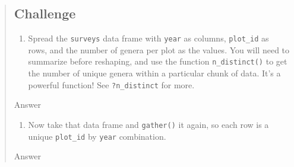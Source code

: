 \documentclass[]{book}
\newenvironment{Shaded}{\begin{snugshade}}{\end{snugshade}}
\newcommand{\KeywordTok}[1]{\textcolor[rgb]{0.13,0.29,0.53}{\textbf{#1}}}
\newcommand{\DataTypeTok}[1]{\textcolor[rgb]{0.13,0.29,0.53}{#1}}
\newcommand{\StringTok}[1]{\textcolor[rgb]{0.31,0.60,0.02}{#1}}
\newcommand{\OperatorTok}[1]{\textcolor[rgb]{0.81,0.36,0.00}{\textbf{#1}}}
\newcommand{\NormalTok}[1]{#1}
\providecommand{\tightlist}{%
  \setlength{\itemsep}{0pt}\setlength{\parskip}{0pt}}
\begin{document}
\begin{quote}
\subsection{Challenge}\label{challenge-7}

\begin{enumerate}
\def\labelenumi{\arabic{enumi}.}
\tightlist
\item
  Spread the \texttt{surveys} data frame with \texttt{year} as columns,
  \texttt{plot\_id} as rows, and the number of genera per plot as the
  values. You will need to summarize before reshaping, and use the
  function \texttt{n\_distinct()} to get the number of unique genera
  within a particular chunk of data. It's a powerful function! See
  \texttt{?n\_distinct} for more.
\end{enumerate}

Answer

\begin{Shaded}
\end{Shaded}

\begin{enumerate}
\def\labelenumi{\arabic{enumi}.}
\setcounter{enumi}{1}
\tightlist
\item
  Now take that data frame and \texttt{gather()} it again, so each row
  is a unique \texttt{plot\_id} by \texttt{year} combination.
\end{enumerate}

Answer

\begin{Shaded}
\end{Shaded}


\end{quote}
\end{document}
